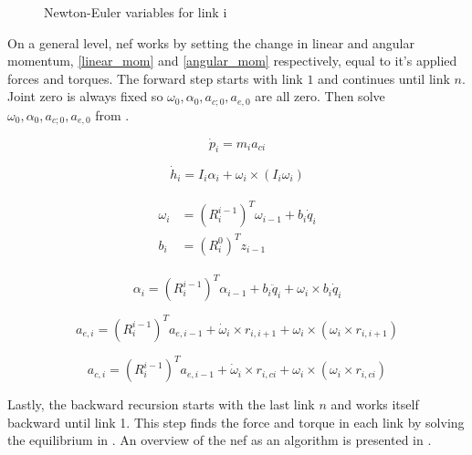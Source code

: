 \begin{figure}[h!]    
    \centering           
    \def\svgwidth{\columnwidth}
    
    \caption{Newton-Euler variables for link i}
    \label{newtonEuler}
\end{figure}

On a general level, \gls{nef} works by setting the change in linear and angular momentum, \eqref{linear_mom} and \eqref{angular_mom} respectively, equal to it's applied forces and torques. The forward step starts with link $1$ and continues until link $n$. Joint zero is always fixed so $\omega_0, \alpha_0, a_{c;0}, a_{e,0}$ are all zero. Then solve $\omega_0, \alpha_0, a_{c;0}, a_{e,0}$ from .

\begin{equation}\label{linear_mom}
\dot{p}_i = m_i a_{ci}
\end{equation}

\begin{equation}\label{angular_mom}
\dot{h}_i = I_i \alpha_i + \omega_i \times \left ( I_i \omega_i \right )
\end{equation}

\begin{align}\label{omega}
\begin{split}
\omega_i &= \left ( R^{i-1}_i \right )^T\omega_{i-1} + b_i\dot{q}_i\\
b_i &= \left ( R^0_i \right )^T z_{i-1}
\end{split}
\end{align}

\begin{equation}\label{alpha}
\alpha_i = \left ( R^{i-1}_i \right )^T\alpha_{i-1} + b_i\ddot{q}_i+\omega_i \times b_i\dot{q}_i
\end{equation}

\begin{equation}\label{a_end}
a_{e,i} = \left ( R^{i-1}_i \right )^T a_{e,i-1} + \dot{\omega}_i \times r_{i,i+1}+\omega_i \times \left ( \omega_i \times r_{i,i+1} \right )
\end{equation}

\begin{equation}\label{a_center}
a_{c,i} = \left ( R^{i-1}_i \right )^T a_{e,i-1} + \dot{\omega}_i \times r_{i,ci}+\omega_i \times \left ( \omega_i \times r_{i,ci} \right )
\end{equation}

Lastly, the backward recursion starts with the last link $n$ and works itself backward until link 1. This step finds the force and torque in each link by solving the equilibrium in . An overview of the \gls{nef} as an algorithm is presented in .


